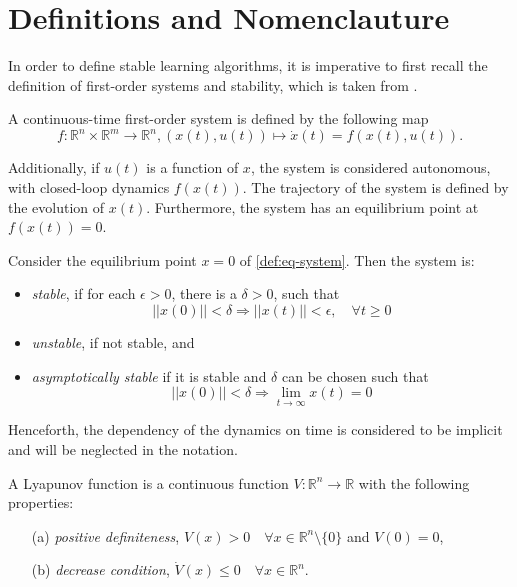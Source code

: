 \section{Definitions and Nomenclauture}

In order to define stable learning algorithms, it is imperative to first recall the definition of first-order systems and stability, which is taken from \cite{khalil_nonlinear_2002}.

\begin{definition}[System]
    A continuous-time first-order system is defined by the following map
       \begin{equation}
       f:\mathbb{R}^n\times\mathbb{R}^m\rightarrow \mathbb{R}^n, (x(t),u(t)) \mapsto \dot x(t) = f(x(t),u(t)).
       \label{def:eq-system}
       \end{equation}
   
       Additionally, if $u(t)$ is a function of $x$, the system is considered autonomous, with closed-loop dynamics $f(x(t))$. The trajectory of the system is defined by the evolution of $x(t)$. Furthermore, the system has an equilibrium point at $f(x(t))=0$.
       \label{def:system}
   \end{definition}
   
   \begin{definition}[Stability]
    Consider the equilibrium point $x=0$ of \eqref{def:eq-system}. Then the system is:
    \begin{itemize}
    \item \textit{stable}, if for each $\epsilon>0$, there is a $\delta>0$, such that
        $$||x(0)||<\delta \Rightarrow ||x(t)||<\epsilon, \quad \forall t \geq 0$$ 
    \item \textit{unstable}, if not stable, and
    \item \textit{asymptotically stable} if it is stable and $\delta$ can be chosen such that
        $$||x(0)||<\delta \Rightarrow \lim_{t\rightarrow\infty} x(t)=0 $$
    \end{itemize} 
   \end{definition}
   Henceforth, the dependency of the dynamics on time is considered to be implicit and will be neglected in the notation.
   
   
   \begin{definition}
    A Lyapunov function is a continuous function $V: \mathbb{R}^n\rightarrow\mathbb{R}$ with the following properties:
    \begin{enumerate}
     \item[(a)] \textit{positive definiteness}, $V(x)>0 \quad \forall x\in\mathbb{R}^n\setminus\{0\}$ and $V(0)=0$,
     \item[(b)] \textit{decrease condition}, $\dot V(x)\leq0 \quad \forall x\in\mathbb{R}^n$.
    \end{enumerate}
    \label{def:lyapunov-function}
   \end{definition}
   
